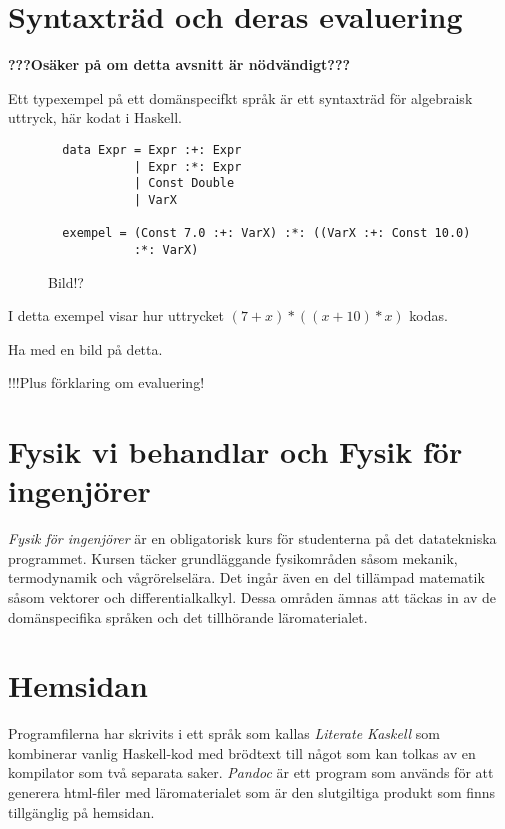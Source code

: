\section{Syntaxträd och deras evaluering}

\textbf{???Osäker på om detta avsnitt är nödvändigt???}



Ett typexempel på ett domänspecifkt språk är ett syntaxträd för algebraisk uttryck, här kodat i Haskell.

\begin{figure}
  \begin{lstlisting}
  data Expr = Expr :+: Expr
            | Expr :*: Expr
            | Const Double
            | VarX

  exempel = (Const 7.0 :+: VarX) :*: ((VarX :+: Const 10.0)
            :*: VarX)
  \end{lstlisting}
  \caption{Bild!?}
  \label{fig:syntax_exempel}
\end{figure}

I detta exempel visar hur uttrycket $(7+x)*((x+10)*x)$ kodas.

Ha med en bild på detta.

!!!Plus förklaring om evaluering!


\section{Fysik vi behandlar och Fysik för ingenjörer}

\begin{draft}
  \emph{Fysik för ingenjörer} är en obligatorisk kurs för studenterna på det
  datatekniska programmet. Kursen täcker grundläggande fysikområden såsom
  mekanik, termodynamik och vågrörelselära. Det ingår även en del tillämpad
  matematik såsom vektorer och differentialkalkyl. Dessa områden ämnas att
  täckas in av de domänspecifika språken och det tillhörande läromaterialet.
\end{draft}

\section{Hemsidan}
\begin{draft}
  Programfilerna har skrivits i ett språk som kallas \textit{Literate Kaskell}
  som kombinerar vanlig Haskell-kod med brödtext till något som kan tolkas av en
  kompilator som två separata saker. \textit{Pandoc} är ett program som används
  för att generera html-filer med läromaterialet som är den slutgiltiga produkt
  som finns tillgänglig på hemsidan.
\end{draft}

